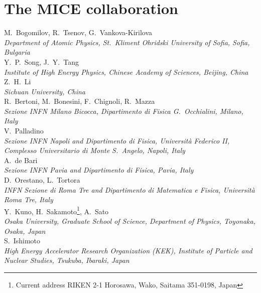 %
\thispagestyle{plain}
\setlength\parindent{0em}%

\section*{The MICE collaboration}

M.~Bogomilov,  R.~Tsenov, G.~Vankova-Kirilova
\\{\it
   Department of Atomic Physics, St.~Kliment Ohridski University of Sofia, Sofia, Bulgaria
}\\

Y.~P.~Song, J.~Y.~Tang
\\{\it
Institute of High Energy Physics, Chinese Academy of Sciences, Beijing, China
}\\

Z.~H.~Li
\\{\it
Sichuan University, China
}\\

R.~Bertoni, M.~Bonesini, F.~Chignoli, R.~Mazza
\\{\it
Sezione INFN Milano Bicocca, Dipartimento di Fisica G.~Occhialini, Milano, Italy
}\\


V.~Palladino
\\{\it
Sezione INFN Napoli and Dipartimento di Fisica, Universit\`{a} Federico II, Complesso Universitario di Monte S.~Angelo, Napoli, Italy
}\\

A.~de Bari
\\{\it 
Sezione INFN Pavia and Dipartimento di Fisica, Pavia, Italy
}\\

D.~Orestano, L.~Tortora
\\{\it
INFN Sezione di Roma Tre and Dipartimento di Matematica e Fisica, Universit\`{a} Roma Tre, Italy
}\\

Y.~Kuno, H.~Sakamoto\footnote{Current address RIKEN 2-1 Horosawa, Wako, Saitama 351-0198, Japan}, A.~Sato
\\{\it
Osaka University, Graduate School of Science, Department of Physics, Toyonaka, Osaka, Japan
}\\

S.~Ishimoto
\\{\it
High Energy Accelerator Research Organization (KEK), Institute of Particle and Nuclear Studies, Tsukuba, Ibaraki, Japan
}\\



